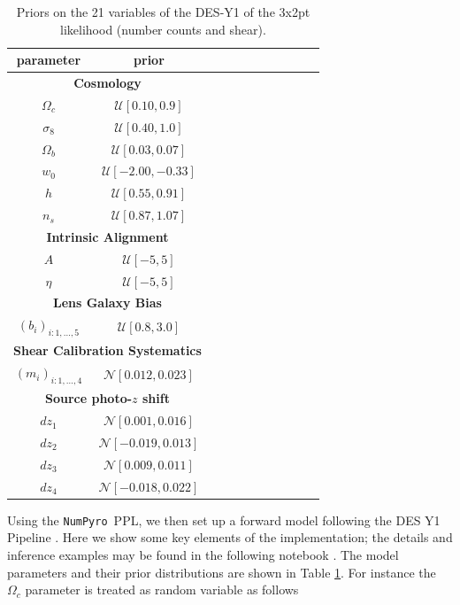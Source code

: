 \documentclass[twocolumn,twocolappendix,nofootinbib,iop]{openjournal}
\newcommand{\nblink}[1]{\href{https://github.com/DifferentiableUniverseInitiative/jax-cosmo-paper/blob/master/notebooks/#1.ipynb}{\faFileCodeO}}
\newcommand{\numpyro}{\texttt{NumPyro}}
\begin{document}
\begin{table}[htb]
\caption{Priors on the 21 variables of the DES-Y1 of the 3x2pt likelihood (number counts and shear).}
\label{tab-DESY1}
 \centering
\begin{tabular}{ccccccccccc}
\hline
 parameter &  prior \\
 \hline
  \multicolumn{2}{c}{\textbf{Cosmology}} \\
$\Omega_c$ & $\mathcal{U}[0.10, 0.9]$ \\ %
$\sigma_8$ & $\mathcal{U}[0.40, 1.0]$ \\
$\Omega_b$ & $\mathcal{U}[0.03, 0.07]$ \\
$w_0$ & $\mathcal{U}[-2.00, -0.33]$ \\
$h$ & $\mathcal{U}[0.55, 0.91]$ \\
$n_s$ & $\mathcal{U}[0.87, 1.07]$ \\
\multicolumn{2}{c}{\textbf{Intrinsic Alignment}} \\
$A$ & $\mathcal{U}[-5,5]$ \\
$\eta$ &$\mathcal{U}[-5,5]$ \\
\multicolumn{2}{c}{\textbf{Lens Galaxy Bias}} \\
$(b_i)_{i:1,\dots,5}$ & $\mathcal{U}[0.8,3.0]$ \\
\multicolumn{2}{c}{\textbf{Shear Calibration Systematics}} \\
$(m_i)_{i:1,\dots,4}$ & $\mathcal{N}[0.012,0.023]$ \\
\multicolumn{2}{c}{\textbf{Source photo-$z$ shift}} \\
$dz_1$ & $\mathcal{N}[0.001,0.016]$ \\ %
$dz_2$ & $\mathcal{N}[-0.019,0.013]$ \\
$dz_3$ & $\mathcal{N}[0.009,0.011]$ \\
$dz_4$ & $\mathcal{N}[-0.018,0.022]$ \\
\hline
\end{tabular}
\end{table}


Using the \numpyro\ PPL, we then set up a forward model following the DES Y1 Pipeline \citep{2018PhRvD..98d3526A}. Here we show some key elements of the implementation; the details and inference examples may be found in the following notebook \nblink{VectorizedNumPyro_block}. The model parameters and their prior distributions are shown in Table \ref{tab-DESY1}.  For instance the $\Omega_c$ parameter is treated as random variable as follows
\end{document}

